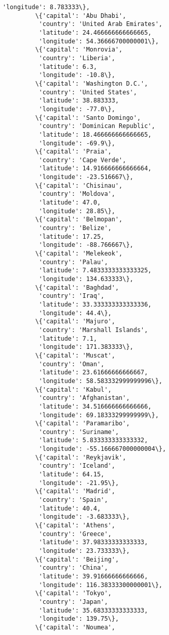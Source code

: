 \documentclass[11pt]{article}
\begin{document}
\begin{Verbatim}[commandchars=\\\{\}]
          'longitude': 8.783333\},
         \{'capital': 'Abu Dhabi',
          'country': 'United Arab Emirates',
          'latitude': 24.466666666666665,
          'longitude': 54.36666700000001\},
         \{'capital': 'Monrovia',
          'country': 'Liberia',
          'latitude': 6.3,
          'longitude': -10.8\},
         \{'capital': 'Washington D.C.',
          'country': 'United States',
          'latitude': 38.883333,
          'longitude': -77.0\},
         \{'capital': 'Santo Domingo',
          'country': 'Dominican Republic',
          'latitude': 18.466666666666665,
          'longitude': -69.9\},
         \{'capital': 'Praia',
          'country': 'Cape Verde',
          'latitude': 14.916666666666664,
          'longitude': -23.516667\},
         \{'capital': 'Chisinau',
          'country': 'Moldova',
          'latitude': 47.0,
          'longitude': 28.85\},
         \{'capital': 'Belmopan',
          'country': 'Belize',
          'latitude': 17.25,
          'longitude': -88.766667\},
         \{'capital': 'Melekeok',
          'country': 'Palau',
          'latitude': 7.4833333333333325,
          'longitude': 134.633333\},
         \{'capital': 'Baghdad',
          'country': 'Iraq',
          'latitude': 33.333333333333336,
          'longitude': 44.4\},
         \{'capital': 'Majuro',
          'country': 'Marshall Islands',
          'latitude': 7.1,
          'longitude': 171.383333\},
         \{'capital': 'Muscat',
          'country': 'Oman',
          'latitude': 23.61666666666667,
          'longitude': 58.583332999999996\},
         \{'capital': 'Kabul',
          'country': 'Afghanistan',
          'latitude': 34.516666666666666,
          'longitude': 69.18333299999999\},
         \{'capital': 'Paramaribo',
          'country': 'Suriname',
          'latitude': 5.833333333333332,
          'longitude': -55.166667000000004\},
         \{'capital': 'Reykjavik',
          'country': 'Iceland',
          'latitude': 64.15,
          'longitude': -21.95\},
         \{'capital': 'Madrid',
          'country': 'Spain',
          'latitude': 40.4,
          'longitude': -3.683333\},
         \{'capital': 'Athens',
          'country': 'Greece',
          'latitude': 37.98333333333333,
          'longitude': 23.733333\},
         \{'capital': 'Beijing',
          'country': 'China',
          'latitude': 39.91666666666666,
          'longitude': 116.38333300000001\},
         \{'capital': 'Tokyo',
          'country': 'Japan',
          'latitude': 35.68333333333333,
          'longitude': 139.75\},
         \{'capital': 'Noumea',

\end{Verbatim}
\end{document}
